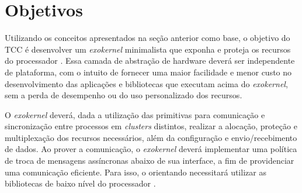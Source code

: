 \documentclass[
	12pt,				%
	openright,			%
	twoside,			%
	a4paper,			%
	english,			%
	brazil,				%
	]{abntex2}
\begin{document}
\section{Objetivos}

Utilizando os conceitos apresentados na seção anterior como base, o objetivo do TCC é desenvolver um \textit{exokernel} minimalista que exponha e proteja os recursos do processador \mppa.
Essa camada de abstração de hardware deverá  ser independente de plataforma, com o intuito de fornecer uma maior facilidade e menor custo no desenvolvimento das aplicações e bibliotecas que executam acima do \textit{exokernel}, sem a perda de desempenho ou do uso personalizado dos recursos.

O \textit{exokernel} deverá, dada a utilização das primitivas \ipc para comunicação e sincronização entre processos em \textit{clusters} distintos, realizar a alocação, proteção e multiplexação dos recursos necessários, além da configuração e envio/recebimento de dados.
Ao prover a comunicação, o \textit{exokernel} deverá implementar uma política de troca de mensagens assíncronas abaixo de sua interface, a fim de providenciar uma comunicação eficiente.
Para isso, o orientando necessitará utilizar as bibliotecas de baixo nível do processador \mppa. 
\end{document}
